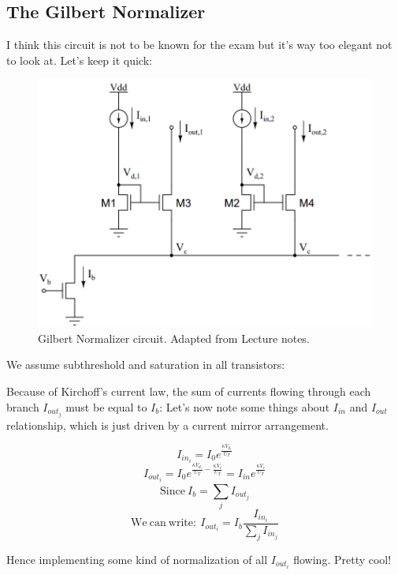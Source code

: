 \subsection{The Gilbert Normalizer}

I think this circuit is not to be known for the exam but it's way too elegant not to look at. Let's keep it quick:

\begin{figure}[H]
    \centering
    \includegraphics[width=0.6\linewidth]{../../Figures/Gilbert_Normalizer.PNG}
    \caption{Gilbert Normalizer circuit. Adapted from Lecture notes.}
    \label{fig:Gilbert_Normalizer}
\end{figure}

We assume subthreshold and saturation in all transistors: 

Because of Kirchoff's current law, the sum of currents flowing through each branch $I_{out_j}$ must be equal to $I_b$: 
Let's now note some things about $I_{in}$ and $I_{out}$ relationship, which is just driven by a current mirror arrangement. 

\begin{equation}
    I_{in_i} = I_0 e^{\frac{\kappa V_d_i}{U_T}}
\end{equation}
\begin{equation}
    I_{out_i} = I_0 e^{\frac{\kappa V_d_i}{U_T} - \frac{\kappa V_c}{U_T}} = I_{in}e^{\frac{\kappa V_c}{U_T}}
\end{equation}
\begin{equation}
    \mathrm{Since \ } I_b = \sum_{j}^{}I_{out_j}
\end{equation}
\begin{equation}
    \mathrm{We \ can \ write: }\ I_{out_i} = I_b \frac{I_{in_i}}{\sum_{j}^{}I_{in_j}}
\end{equation}

Hence implementing some kind of normalization of all $I_{out_i}$ flowing. Pretty cool!